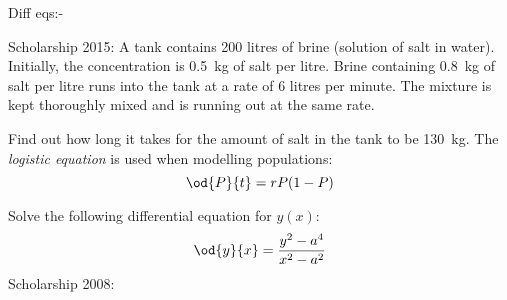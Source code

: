 Diff eqs:-
  \item Scholarship 2015: A tank contains 200 litres of brine (solution of salt in water). Initially, the concentration is \SI{0.5}{\kilo\gram}
        of salt per litre. Brine containing \SI{0.8}{\kilo\gram} of salt per litre runs into the tank at a rate of 6 litres per
        minute. The mixture is kept thoroughly mixed and is running out at the same rate.

        Find out how long it takes for the amount of salt in the tank to be \SI{130}{\kilo\gram}.
  \question The \textit{logistic equation} is used when modelling populations:
            \begin{displaymath}
              \od{P}{t} = rP(1-P)
            \end{displaymath}
  \questioS Solve the following differential equation for $ y(x) $:
    \begin{displaymath}
      \od{y}{x} = \frac{y^2 - a^4}{x^2 - a^2}
    \end{displaymath}
  \questioS Scholarship 2008:
